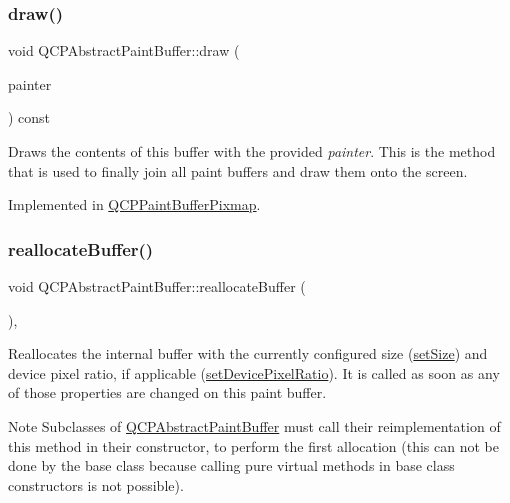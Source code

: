 \subsubsection{\texorpdfstring{draw()}{draw()}}
{\footnotesize\ttfamily void Q\+C\+P\+Abstract\+Paint\+Buffer\+::draw (\begin{DoxyParamCaption}\item[{\mbox{\hyperlink{class_q_c_p_painter}{Q\+C\+P\+Painter}} $\ast$}]{painter }\end{DoxyParamCaption}) const\hspace{0.3cm}{\ttfamily [pure virtual]}}

Draws the contents of this buffer with the provided {\itshape painter}. This is the method that is used to finally join all paint buffers and draw them onto the screen. 

Implemented in \mbox{\hyperlink{class_q_c_p_paint_buffer_pixmap_af7bfc685e56a0a9329e57cd9a265eb74}{Q\+C\+P\+Paint\+Buffer\+Pixmap}}.

\mbox{\label{class_q_c_p_abstract_paint_buffer_aee7506a52bd7e5a07c2af27935eb13e7}} 
\subsubsection{\texorpdfstring{reallocate\+Buffer()}{reallocateBuffer()}}
{\footnotesize\ttfamily void Q\+C\+P\+Abstract\+Paint\+Buffer\+::reallocate\+Buffer (\begin{DoxyParamCaption}{ }\end{DoxyParamCaption})\hspace{0.3cm}{\ttfamily [protected]}, {}}

Reallocates the internal buffer with the currently configured size (\mbox{\hyperlink{class_q_c_p_abstract_paint_buffer_a8b68c3cd36533f1a4a23b5ce8cd66f01}{set\+Size}}) and device pixel ratio, if applicable (\mbox{\hyperlink{class_q_c_p_abstract_paint_buffer_a555eaad5d5c806420ff35602a1bb68fa}{set\+Device\+Pixel\+Ratio}}). It is called as soon as any of those properties are changed on this paint buffer.

\begin{DoxyNote}{Note}
Subclasses of \mbox{\hyperlink{class_q_c_p_abstract_paint_buffer}{Q\+C\+P\+Abstract\+Paint\+Buffer}} must call their reimplementation of this method in their constructor, to perform the first allocation (this can not be done by the base class because calling pure virtual methods in base class constructors is not possible). 
\end{DoxyNote}


